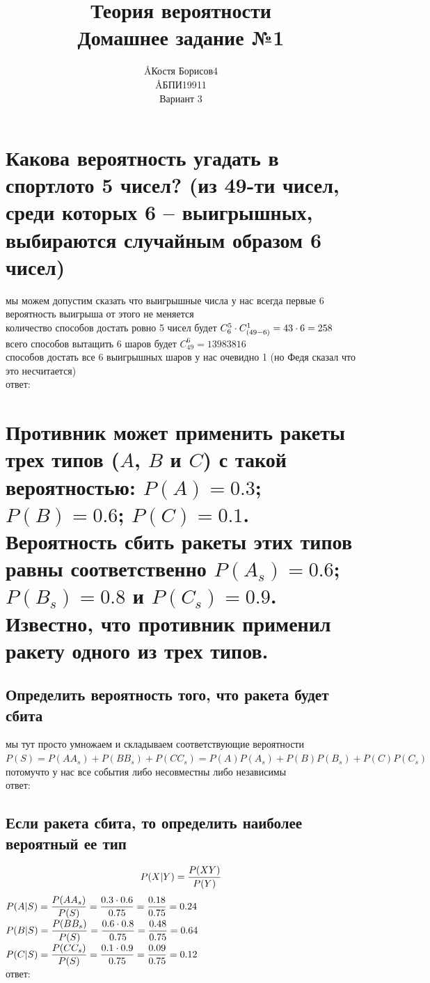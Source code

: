 \documentclass{article}
\title{Теория вероятности \\ Домашнее задание №1}
\author{\AA{Костя Борисов}{4} \\ \AA{БПИ199}{11} \\ Вариант 3}
\begin{document}
  \maketitle

  \section{Какова вероятность угадать в спортлото 5 чисел? (из 49-ти чисел, среди которых 6 -- выигрышных, выбираются случайным образом 6 чисел)}
  мы можем допустим сказать что выигрышные числа у нас всегда первые 6 \\
  вероятность выигрыша от этого не меняется \\
  количество способов достать ровно 5 чисел будет $C^5_6 \cdot C^1_{\left(49-6\right)} = 43 \cdot 6 = 258$ \\
  всего способов вытащить 6 шаров будет $C^6_{49} = 13983816$ \\
  способов достать все 6 выигрышных шаров у нас очевидно 1 (но Федя сказал что это несчитается) \\
  ответ: 


  \section{Противник может применить ракеты трех типов ($A$, $B$ и $C$) с такой вероятностью: $P(A) = 0.3$; $P(B) = 0.6$; $P(C) = 0.1$. Вероятность сбить ракеты этих типов равны соответственно $P(A_s) = 0.6$; $P(B_s) = 0.8$ и $P(C_s) = 0.9$. Известно, что противник применил ракету одного из трех типов.}

  \subsection{Определить вероятность того, что ракета будет сбита}
  мы тут просто умножаем и складываем соответствующие вероятности \\
  $P(S) = P(AA_s) + P(BB_s) + P(CC_s) = P(A)P(A_s) + P(B)P(B_s) + P(C)P(C_s)$ \\
  потомучто у нас все события либо несовместны либо независимы \\
  ответ: 

  \subsection{Если ракета сбита, то определить наиболее вероятный ее тип}
  $$ P(X|Y) = \frac{P(XY)}{P(Y)} $$
  $\displaystyle P(A|S) = \frac{P(AA_s)}{P(S)} = \frac{0.3 \cdot 0.6}{0.75} = \frac{0.18}{0.75} = 0.24$ \\
  $\displaystyle P(B|S) = \frac{P(BB_s)}{P(S)} = \frac{0.6 \cdot 0.8}{0.75} = \frac{0.48}{0.75} = 0.64$ \\
  $\displaystyle P(C|S) = \frac{P(CC_s)}{P(S)} = \frac{0.1 \cdot 0.9}{0.75} = \frac{0.09}{0.75} = 0.12$ \\
  ответ: 
\end{document}

